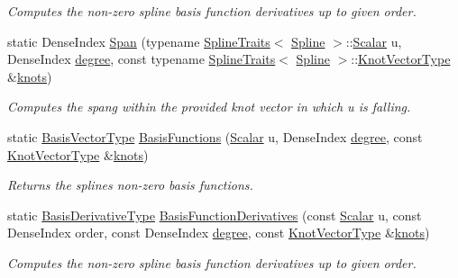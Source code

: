 \begin{DoxyCompactItemize}
\begin{DoxyCompactList}\small\item\em Computes the non-\/zero spline basis function derivatives up to given order. \end{DoxyCompactList}\item 
\mbox{\label{group___splines___module_adb63c6f958a85a911ce4080d1f8ea39d}} 
static Dense\+Index \hyperlink{group___splines___module_adb63c6f958a85a911ce4080d1f8ea39d}{Span} (typename \hyperlink{struct_eigen_1_1_spline_traits}{Spline\+Traits}$<$ \hyperlink{group___splines___module_class_eigen_1_1_spline}{Spline} $>$\+::\hyperlink{group___splines___module_a8cafd78b564825c76fbb3419653d9742}{Scalar} u, Dense\+Index \hyperlink{group___splines___module_a0df23e941ac0f31dcd095a4dd4f4a7ec}{degree}, const typename \hyperlink{struct_eigen_1_1_spline_traits}{Spline\+Traits}$<$ \hyperlink{group___splines___module_class_eigen_1_1_spline}{Spline} $>$\+::\hyperlink{group___splines___module_a066f7a8b120316c9068b559f0790e9ec}{Knot\+Vector\+Type} \&\hyperlink{group___splines___module_ae3eac8af580ad880d8ad3a259d453aa1}{knots})
\begin{DoxyCompactList}\small\item\em Computes the spang within the provided knot vector in which u is falling. \end{DoxyCompactList}\item 
static \hyperlink{group___splines___module_a1d49cef942ea59d85d1711ee32354e6b}{Basis\+Vector\+Type} \hyperlink{group___splines___module_a038506788499d71aedddc5211c33bb6e}{Basis\+Functions} (\hyperlink{group___splines___module_a8cafd78b564825c76fbb3419653d9742}{Scalar} u, Dense\+Index \hyperlink{group___splines___module_a0df23e941ac0f31dcd095a4dd4f4a7ec}{degree}, const \hyperlink{group___splines___module_a066f7a8b120316c9068b559f0790e9ec}{Knot\+Vector\+Type} \&\hyperlink{group___splines___module_ae3eac8af580ad880d8ad3a259d453aa1}{knots})
\begin{DoxyCompactList}\small\item\em Returns the spline\textquotesingle{}s non-\/zero basis functions. \end{DoxyCompactList}\item 
static \hyperlink{group___splines___module_a9db0b0108353660cd03524f2e67d6b3c}{Basis\+Derivative\+Type} \hyperlink{group___splines___module_a2e42e79b08b560007062b8f56689ae24}{Basis\+Function\+Derivatives} (const \hyperlink{group___splines___module_a8cafd78b564825c76fbb3419653d9742}{Scalar} u, const Dense\+Index order, const Dense\+Index \hyperlink{group___splines___module_a0df23e941ac0f31dcd095a4dd4f4a7ec}{degree}, const \hyperlink{group___splines___module_a066f7a8b120316c9068b559f0790e9ec}{Knot\+Vector\+Type} \&\hyperlink{group___splines___module_ae3eac8af580ad880d8ad3a259d453aa1}{knots})
\begin{DoxyCompactList}\small\item\em Computes the non-\/zero spline basis function derivatives up to given order. \end{DoxyCompactList}\end{DoxyCompactItemize}


